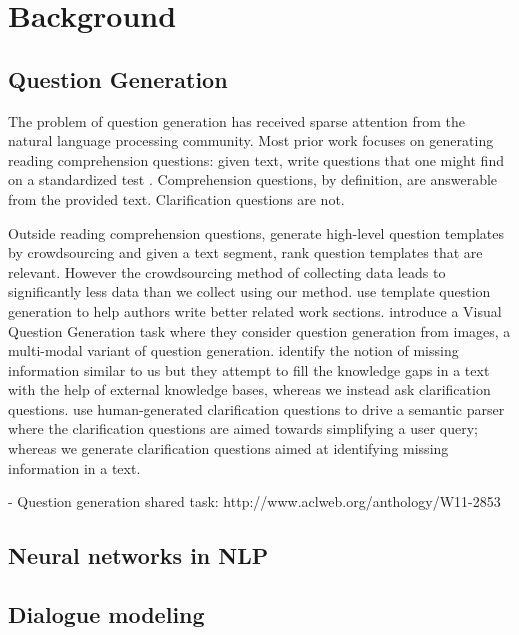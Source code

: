 \documentclass[11pt]{report}
\begin{document}
\newpage

\chapter{Background}\label{background}

\section{Question Generation}

The problem of question generation has received sparse attention from the natural language processing community. Most prior work focuses on generating reading comprehension questions:  given text, write questions that one might find on a standardized test \cite{vanderwende2008importance,heilman2011automatic,rus2011question,olney2012question}.  Comprehension questions, by definition, are answerable from the provided text. Clarification questions are not.  

Outside reading comprehension questions, \cite{labutov2015deep} generate high-level question templates by crowdsourcing and given a text segment, rank question templates that are relevant. However the crowdsourcing method of collecting data leads to significantly less data than we collect using our method. \cite{liu2010automatic} use template question generation to help authors write better related work sections. \cite{mostafazadeh2016generating} introduce a Visual Question Generation task where they consider question generation from images, a multi-modal variant of question generation. 
\cite{penas2010filling} identify the notion of missing information similar to us but they attempt to fill the knowledge gaps in a text with the help of external knowledge bases, whereas we instead ask clarification questions. \cite{artzi2011bootstrapping} use human-generated clarification questions to drive a semantic parser where the clarification questions are aimed towards simplifying a user query; whereas we generate clarification questions aimed at  identifying missing information in a text. 

- Question generation shared task: http://www.aclweb.org/anthology/W11-2853

\section{Neural networks in NLP}

\section{Dialogue modeling}
\end{document}
